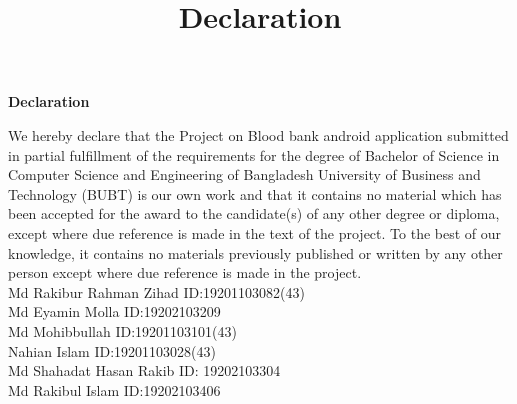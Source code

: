 \title{Declaration}
\begin{center}
    \large \textbf{Declaration}
\end{center}
\vspace{5.5mm}
We hereby declare that the Project on Blood bank android application submitted in
partial fulfillment of the requirements for the degree
of Bachelor of Science in Computer Science and Engineering of Bangladesh
University of Business and Technology (BUBT) is our own work and that it
contains no material which has been accepted for the award to the candidate(s)
of any other degree or diploma, except where due reference is made in the text
of the project. To the best of our knowledge, it contains no materials previously
published or written by any other person except where due reference is made in
the project.
\vspace{11mm}\\
Md Rakibur Rahman Zihad \hspace{11mm} ID:19201103082(43)\\
    Md Eyamin Molla \hspace{14mm} ID:19202103209\\
    Md Mohibbullah \hspace{14mm} ID:19201103101(43)\\
 Nahian Islam \hspace{18mm} ID:19201103028(43)\\
   Md Shahadat Hasan Rakib \hspace{6mm} ID: 19202103304\\
   Md Rakibul Islam \hspace{12} ID:19202103406\\